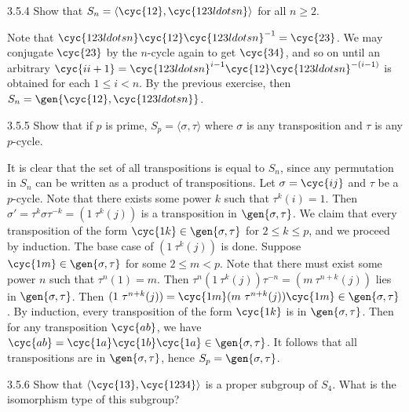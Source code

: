 \begin{exercise}{3.5.4}
    Show that $S_n=\langle \cyc{1 2},\cyc{1 2 3 ldots n}\rangle$ for all $n\ge2$.
\end{exercise}

\begin{sol}
    Note that $\cyc{1 2 3 ldots n}\cyc{1 2}\cyc{1 2 3 ldots n}^{-1} = \cyc{2 3}$.
	We may conjugate $\cyc{2 3}$ by the $n$-cycle again to get $\cyc{3 4}$, and so on until an arbitrary $\cyc{i i + 1} = \cyc{1 2 3 ldots n}^{i - 1}\cyc{1 2}\cyc{1 2 3 ldots n}^{-(i - 1)}$ is obtained for each $1 \leq i < n$.
	By the previous exercise, then $S_n = \gen{\cyc{1 2}, \cyc{1 2 3 ldots n}}$.
\end{sol}

\begin{exercise}{3.5.5}
    Show that if $p$ is prime, $S_p=\langle \sigma,\tau\rangle$ where $\sigma$ is any transposition and $\tau$ is any $p$-cycle.
\end{exercise}

\begin{sol}
    It is clear that the set of all transpositions is equal to $S_n$, since any permutation in $S_n$ can be written as a product of transpositions.
	Let $\sigma = \cyc{i j}$ and $\tau$ be a $p$-cycle.
	Note that there exists some power $k$ such that $\tau^k(i) = 1$.
	Then $\sigma' = \tau^k\sigma\tau^{-k} = (1\ \tau^k(j))$ is a transposition in $\gen{\sigma, \tau}$.
	We claim that every transposition of the form $\cyc{1 k} \in \gen{\sigma, \tau}$ for $2 \leq k \leq p$, and we proceed by induction.
	The base case of $(1\ \tau^k(j))$ is done.
	Suppose $\cyc{1 m} \in \gen{\sigma, \tau}$ for some $2 \leq m < p$.
	Note that there must exist some power $n$ such that $\tau^n(1) = m$.
	Then $\tau^n(1\ \tau^k(j))\tau^{-n} = (m\ \tau^{n + k}(j))$ lies in $\gen{\sigma, \tau}$.
	Then $(1\ \tau^{n + k}(j)) = \cyc{1 m}(m\ \tau^{n + k}(j))\cyc{1 m} \in \gen{\sigma, \tau}$.
	By induction, every transposition of the form $\cyc{1 k}$ is in $\gen{\sigma, \tau}$.
	Then for any transposition $\cyc{a b}$, we have $\cyc{a b} = \cyc{1 a}\cyc{1 b}\cyc{1 a} \in \gen{\sigma, \tau}$.
	It follows that all transpositions are in $\gen{\sigma, \tau}$, hence $S_p = \gen{\sigma, \tau}$.
\end{sol}

\begin{exercise}{3.5.6}
    Show that $\langle \cyc{1 3},\cyc{1 2 3 4}\rangle$ is a proper subgroup of $S_4$.
	What is the isomorphism type of this subgroup?
\end{exercise}

